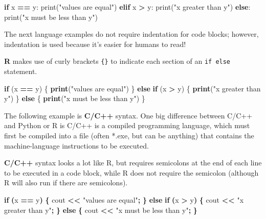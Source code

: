 \documentclass[
]{book}
\newenvironment{Shaded}{\begin{snugshade}}{\end{snugshade}}
\newcommand{\BuiltInTok}[1]{#1}
\newcommand{\ControlFlowTok}[1]{\textcolor[rgb]{0.13,0.29,0.53}{\textbf{#1}}}
\newcommand{\FunctionTok}[1]{\textcolor[rgb]{0.13,0.29,0.53}{\textbf{#1}}}
\newcommand{\NormalTok}[1]{#1}
\newcommand{\OperatorTok}[1]{\textcolor[rgb]{0.81,0.36,0.00}{\textbf{#1}}}
\newcommand{\SpecialCharTok}[1]{\textcolor[rgb]{0.81,0.36,0.00}{\textbf{#1}}}
\newcommand{\StringTok}[1]{\textcolor[rgb]{0.31,0.60,0.02}{#1}}
\begin{document}
\begin{Shaded}
\begin{Highlighting}[]
\ControlFlowTok{if}\NormalTok{ x }\OperatorTok{==}\NormalTok{ y:}
  \BuiltInTok{print}\NormalTok{(}\StringTok{"values are equal"}\NormalTok{)}
\ControlFlowTok{elif}\NormalTok{ x }\OperatorTok{\textgreater{}}\NormalTok{ y:}
  \BuiltInTok{print}\NormalTok{(}\StringTok{"x greater than y"}\NormalTok{)}
\ControlFlowTok{else}\NormalTok{:}
  \BuiltInTok{print}\NormalTok{(}\StringTok{"x must be less than y"}\NormalTok{)}
\end{Highlighting}
\end{Shaded}

The next language examples do not require indentation for code blocks; however, indentation is used because it's easier for humans to read!

\textbf{R} makes use of curly brackets \texttt{\{\}} to indicate each section of an \texttt{if\ else} statement.

\begin{Shaded}
\begin{Highlighting}[]
\ControlFlowTok{if}\NormalTok{ (x }\SpecialCharTok{==}\NormalTok{ y) \{}
  \FunctionTok{print}\NormalTok{(}\StringTok{"values are equal"}\NormalTok{)}
\NormalTok{\} }\ControlFlowTok{else} \ControlFlowTok{if}\NormalTok{ (x }\SpecialCharTok{\textgreater{}}\NormalTok{ y) \{}
  \FunctionTok{print}\NormalTok{(}\StringTok{"x greater than y"}\NormalTok{)}
\NormalTok{\} }\ControlFlowTok{else}\NormalTok{ \{}
  \FunctionTok{print}\NormalTok{(}\StringTok{"x must be less than y"}\NormalTok{)}
\NormalTok{\}}
\end{Highlighting}
\end{Shaded}

The following example is \textbf{C/C++} syntax. One big difference between C/C++ and Python or R is C/C++ is a compiled programming language, which must first be compiled into a file (often *.exe, but can be anything) that contains the machine-language instructions to be executed.

\textbf{C/C++} syntax looks a lot like R, but requires semicolons at the end of each line to be executed in a code block, while R does not require the semicolon (although R will also run if there are semicolons).

\begin{Shaded}
\begin{Highlighting}[]
\ControlFlowTok{if} \OperatorTok{(}\NormalTok{x }\OperatorTok{==}\NormalTok{ y}\OperatorTok{)} \OperatorTok{\{}
\NormalTok{  cout }\OperatorTok{\textless{}\textless{}} \StringTok{"values are equal"}\OperatorTok{;}
\OperatorTok{\}} \ControlFlowTok{else} \ControlFlowTok{if} \OperatorTok{(}\NormalTok{x }\OperatorTok{\textgreater{}}\NormalTok{ y}\OperatorTok{)} \OperatorTok{\{}
\NormalTok{  cout }\OperatorTok{\textless{}\textless{}} \StringTok{"x greater than y"}\OperatorTok{;}
\OperatorTok{\}} \ControlFlowTok{else} \OperatorTok{\{}
\NormalTok{  cout }\OperatorTok{\textless{}\textless{}} \StringTok{"x must be less than y"}\OperatorTok{;}
\OperatorTok{\}}
\end{Highlighting}
\end{Shaded}
\end{document}
